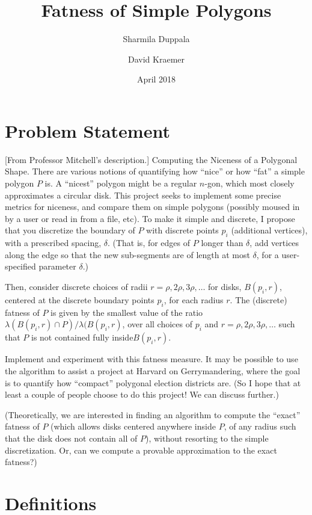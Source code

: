 \documentclass{article}
\title{Fatness of Simple Polygons}
\author{Sharmila Duppala \and David Kraemer}
\date{April 2018}
\theoremstyle{definition}
\begin{document}
\maketitle

\section{Problem Statement} 

[From Professor Mitchell's description.]
Computing the Niceness of a Polygonal Shape. There are various notions of
quantifying how “nice” or how “fat” a simple polygon $P$ is. A “nicest” polygon
might be a regular $n$-gon, which most closely approximates a circular disk. This
project seeks to implement some precise metrics for niceness, and compare them
on simple polygons (possibly moused in by a user or read in from a file, etc).
To make it simple and discrete, I propose that you discretize the boundary of
$P$ with discrete points $p_i$ (additional vertices), with a prescribed spacing,
$\delta$. (That is, for edges of $P$ longer than $\delta$, add vertices along
  the edge so that the new sub-segments are of length at most $\delta$, for a
user-specified parameter $\delta$.)

Then, consider discrete choices of radii $r = \rho, 2\rho, 3\rho, \ldots$ for
disks, $B(p_i,r)$, centered at the discrete boundary points $p_i$, for each
radius $r$. The (discrete) fatness of $P$ is given by the smallest value of the
ratio $\lambda (B(p_i,r)\cap P)/\lambda (B(p_i, r)$, over all choices of $p_i$ and $r =
  \rho, 2\rho, 3\rho, \ldots$ such that $P$ is not contained fully
  inside$B(p_i,r)$.

Implement and experiment with this fatness measure. It may be possible to use
the algorithm to assist a project at Harvard on Gerrymandering, where the goal
is to quantify how “compact” polygonal election districts are. (So I hope that
at least a couple of people choose to do this project! We can discuss further.)

(Theoretically, we are interested in finding an algorithm to compute the “exact”
fatness of $P$ (which allows disks centered anywhere inside $P$, of any radius
such that the disk does not contain all of $P$), without resorting to the simple
discretization. Or, can we compute a provable approximation to the exact
fatness?)

\section{Definitions}
\end{document}
